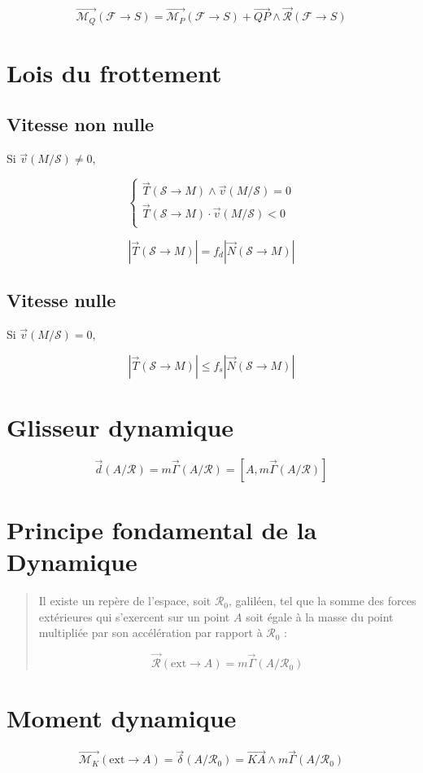 \documentclass[a4paper, 11pt]{article}
\newcommand{\V}{\overrightarrow}
\newcommand{\R}{\mathcal{R}}
\newcommand{\F}{\mathcal{F}}
\newcommand{\M}{\mathcal{M}}
\newcommand{\s}{\mathcal{S}}
\begin{document}
$$\V{\M_Q}(\F\rightarrow S) = \V{\M_P}(\F\rightarrow S) + \V{QP}\wedge\V{\R}(\F\rightarrow S)$$


\section{Lois du frottement} %

\subsection{Vitesse non nulle}

Si $\V{v}(M/\s) \not= 0$,

$$\left\{
\begin{array}{l}
    \V{T}(\s \rightarrow M) \wedge \V{v}(M/\s) = 0\\
    \V{T}(\s \rightarrow M) \cdot \V{v}(M/\s) < 0\\
\end{array}
\right.$$

$$\left|\V{T}(\s\rightarrow M)\right| = f_d\left|\V{N}(\s\rightarrow M)\right|$$


\subsection{Vitesse nulle}

Si $\V{v}(M/\s) = 0$,

$$\left|\V{T}(\s\rightarrow M)\right| \leq f_s\left|\V{N}(\s\rightarrow M)\right|$$

\section{Glisseur dynamique} %

$$\V{d}(A/\R) = m\V{\Gamma}(A/\R) = \left[A, m\V{\Gamma}(A/\R)\right]$$

\section{Principe fondamental de la Dynamique} %

\begin{quote}
    Il existe un repère de l'espace, soit $\R_0$, galiléen, tel que la somme des forces extérieures qui s'exercent sur
    un point $A$ soit égale à la masse du point multipliée par son accélération par rapport à $\R_0$ :

    $$\V{\R}(\mathrm{ext}\rightarrow A) = m\V{\Gamma}(A/\R_0)$$

\end{quote}

\section{Moment dynamique} %

$$\V{\M_K}(\mathrm{ext}\rightarrow A) = \V{\delta}(A/\R_0) = \V{KA}\wedge m\V{\Gamma}(A/\R_0)$$
\end{document}
